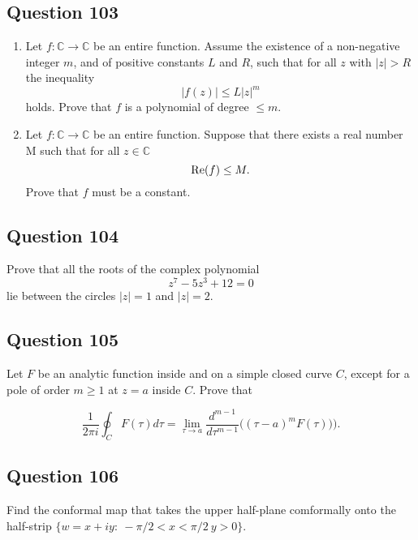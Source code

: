 \documentclass[12pt]{article}
\begin{document}
\hypertarget{question-103-1}{%
\subsection{Question 103}\label{question-103-1}}

\begin{enumerate}
\def\labelenumi{(\alph{enumi})}
\item
  Let \(f:{\mathbb C}\rightarrow {\mathbb C}\) be an entire function.
  Assume the existence of a non-negative integer \(m\), and of positive
  constants \(L\) and \(R\), such that for all \(z\) with \(|z|>R\) the
  inequality \[|f(z)| \leq L |z|^m\] holds. Prove that \(f\) is a
  polynomial of degree \(\leq m\).
\item
  Let \(f:{\mathbb C}\rightarrow {\mathbb C}\) be an entire function.
  Suppose that there exists a real number M such that for all
  \(z\in {\mathbb C}\) \[\mbox{\textrm Re} (f) \leq M.\] Prove that
  \(f\) must be a constant.
\end{enumerate}

\hypertarget{question-104-1}{%
\subsection{Question 104}\label{question-104-1}}

Prove that all the roots of the complex polynomial
\[z^7 - 5 z^3 +12 =0\] lie between the circles \(|z|=1\) and \(|z|=2\).

\hypertarget{question-105-1}{%
\subsection{Question 105}\label{question-105-1}}

Let \(F\) be an analytic function inside and on a simple closed curve
\(C\), except for a pole of order \(m\geq 1\) at \(z=a\) inside \(C\).
Prove that

\[
\frac{1}{2 \pi i}\oint_{C} F(\tau) d\tau = 
\lim_{\tau\rightarrow a} \frac{d^{m-1}}{d\tau^{m-1}}\big((\tau-a)^m F(\tau))\big)
.\]

\hypertarget{question-106-1}{%
\subsection{Question 106}\label{question-106-1}}

Find the conformal map that takes the upper half-plane comformally onto
the half-strip \(\{ w=x+iy:\ -\pi/2<x<\pi/2\ y>0\}\).
\end{document}
